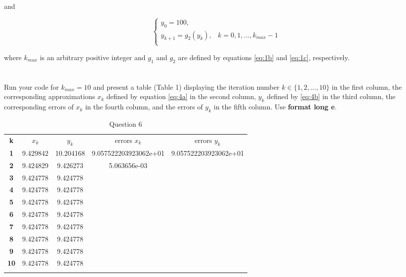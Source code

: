 \documentclass{article}
\begin{document}
and 

\begin{equation}\label{eq:4b}
    \begin{cases}
    y_0 = 100,\\
    y_{k+1}= g_2(y_k), & k=0,1,\dots , k_{max}-1\\
    \end{cases}
\end{equation}

where $k_{max}$ is an arbitrary positive integer and $g_1$ and $g_2$ are defined by equations \ref{eq:1b} and \ref{eq:1c}, respectively. 

\vspace{10mm}

\section{}
Run your code for $k_{max}=10$ and present a table (Table 1) displaying the iteration number $k \in \{1,2,\dots,10\}$ in the first column, the corresponding approximations $x_k$ defined by equation \ref{eq:4a} in the second column, $y_k$ defined by \ref{eq:4b} in the third column, the corresponding errors of $x_k$ in the fourth column, and the errors of $y_k$ in the fifth column. Use {\selectfont \textbf{format long e}}.
\vspace{10mm}

\begin{table}[H]
    \centering
    \begin{tabular}{|c|c|c|c|c|}
    \Xhline{1 pt}
    \textbf{k} & $x_k$& $y_k$& \makecell{errors\\$x_k $ }  & \makecell{errors \\$y_k$}  \\
    \Xhline{2 pt}
    \textbf{1} &	9.429842&	10.204168&9.057522203923062e+01 &9.057522203923062e+01\\
    \Xhline{1 pt}
    \textbf{2} &9.424829&	9.426273&5.063656e-03&\\
    \Xhline{1 pt}
    \textbf{3} &9.424778&	9.424778&&  \\
    \Xhline{1 pt}
    \textbf{4} &9.424778&	9.424778&&  \\
    \Xhline{1 pt}
    \textbf{5} &9.424778&	9.424778&& \\
    \Xhline{1 pt}
    \textbf{6} &9.424778&	9.424778&&  \\
    \Xhline{1 pt}
    \textbf{7} &9.424778&	9.424778&&  \\
    \Xhline{1 pt}
    \textbf{8} &9.424778&	9.424778&& \\
    \Xhline{1 pt}
    \textbf{9} &9.424778&	9.424778&&  \\
     \Xhline{1 pt}
    \textbf{10} &9.424778&	9.424778&&  \\
    \Xhline{1 pt}
    \end{tabular}
    \caption{Question 6}
    \label{tab:my_label}
\end{table}
\end{document}
